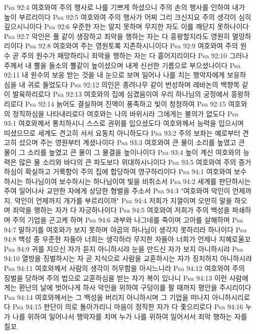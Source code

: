 Psa 92:4  여호와여 주의 행사로 나를 기쁘게 하셨으니 주의 손의 행사를 인하여 내가 높이 부르리이다
Psa 92:5  여호와여 주의 행사가 어찌 그리 크신지요 주의 생각이 심히 깊으시니이다
Psa 92:6  우준한 자는 알지 못하며 무지한 자도 이를 깨닫지 못하나이다
Psa 92:7  악인은 풀 같이 생장하고 죄악을 행하는 자는 다 흥왕할지라도 영원히 멸망하리이다
Psa 92:8  여호와여 주는 영원토록 지존하시니이다
Psa 92:9  여호와여 주의 원수 곧 주의 원수가 패망하리니 죄악을 행하는 자는 다 흩어지리이다
Psa 92:10  그러나 주께서 내 뿔을 들소의 뿔같이 높이셨으며 내게 신선한 기름으로 부으셨나이다
Psa 92:11  내 원수의 보응 받는 것을 내 눈으로 보며 일어나 나를 치는 행악자에게 보응하심을 내 귀로 들었도다
Psa 92:12  의인은 종려나무 같이 번성하며 레바논의 백향목 같이 발육하리로다
Psa 92:13  여호와의 집에 심겼음이여 우리 하나님의 궁정에서 흥왕하리로다
Psa 92:14  늙어도 결실하며 진액이 풍족하고 빛이 청청하여
Psa 92:15  여호와의 정직하심을 나타내리로다 여호와는 나의 바위시라 그에게는 불의가 없도다
Psa 93:1  여호와께서 통치하시니 스스로 권위를 입으셨도다 여호와께서 능력을 입으시며 띠셨으므로 세계도 견고히 서서 요동치 아니하도다
Psa 93:2  주의 보좌는 예로부터 견고히 섰으며 주는 영원부터 계셨나이다
Psa 93:3  여호와여 큰 물이 소리를 높였고 큰 물이 그 소리를 높였고 큰 물이 그 물결을 높이나이다
Psa 93:4  높이 계신 여호와의 능력은 많은 물 소리와 바다의 큰 파도보다 위대하시니이다
Psa 93:5  여호와여 주의 증거하심이 확실하고 거룩함이 주의 집에 합당하여 영구하리이다
Psa 94:1  여호와여 보수하시는 하나님이여 보수하시는 하나님이여 빛을 비취소서
Psa 94:2  세계를 판단하시는 주여 일어나사 교만한 자에게 상당한 형벌을 주소서
Psa 94:3  "여호와여 악인이 언제까지, 악인이 언제까지 개가를 부르리이까"
Psa 94:4  저희가 지껄이며 오만히 말을 하오며 죄악을 행하는 자가 다 자긍하나이다
Psa 94:5  여호와여 저희가 주의 백성을 파쇄하며 주의 기업을 곤고케 하며
Psa 94:6  과부와 나그네를 죽이며 고아를 살해하며
Psa 94:7  말하기를 여호와가 보지 못하며 야곱의 하나님이 생각지 못하리라 하나이다
Psa 94:8  백성 중 우준한 자들아 너희는 생각하라 무지한 자들아 너희가 언제나 지혜로울꼬
Psa 94:9  귀를 지으신 자가 듣지 아니하시랴 눈을 만드신 자가 보지 아니하시랴
Psa 94:10  열방을 징벌하시는 자 곧 지식으로 사람을 교훈하시는 자가 징치하지 아니하시랴
Psa 94:11  여호와께서 사람의 생각이 허무함을 아시느니라
Psa 94:12  여호와여 주의 징벌을 당하며 주의 법으로 교훈하심을 받는 자가 복이 있나니
Psa 94:13  이런 사람에게는 환난의 날에 벗어나게 하사 악인을 위하여 구덩이를 팔 때까지 평안을 주시리이다
Psa 94:14  여호와께서는 그 백성을 버리지 아니하시며 그 기업을 떠나지 아니하시리로다
Psa 94:15  판단이 의로 돌아가리니 마음이 정직한 자가 다 좇으리로다
Psa 94:16  누가 나를 위하여 일어나서 행악자를 치며 누가 나를 위하여 일어서서 죄악 행하는 자를 칠꼬
